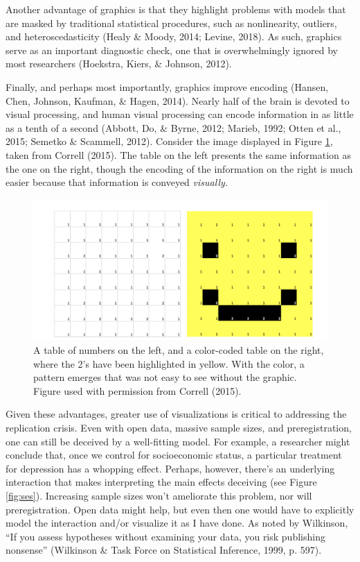 \documentclass[
  man]{apa6}
\begin{document}
Another advantage of graphics is that they highlight problems with models that are masked by traditional statistical procedures, such as nonlinearity, outliers, and heteroscedasticity (Healy \& Moody, 2014; Levine, 2018). As such, graphics serve as an important diagnostic check, one that is overwhelmingly ignored by most researchers (Hoekstra, Kiers, \& Johnson, 2012).

Finally, and perhaps most importantly, graphics improve encoding (Hansen, Chen, Johnson, Kaufman, \& Hagen, 2014). Nearly half of the brain is devoted to visual processing, and human visual processing can encode information in as little as a tenth of a second (Abbott, Do, \& Byrne, 2012; Marieb, 1992; Otten et al., 2015; Semetko \& Scammell, 2012). Consider the image displayed in Figure \ref{fig:smiley}, taken from Correll (2015). The table on the left presents the same information as the one on the right, though the encoding of the information on the right is much easier because that information is conveyed \emph{visually.}

\begin{figure}
\centering
\includegraphics{images/smiley.png}
\caption{A table of numbers on the left, and a color-coded table on the right, where the 2's have been highlighted in yellow. With the color, a pattern emerges that was not easy to see without the graphic. Figure used with permission from Correll (2015).}
\label{fig:smiley}
\end{figure}

Given these advantages, greater use of visualizations is critical to addressing the replication crisis. Even with open data, massive sample sizes, and preregistration, one can still be deceived by a well-fitting model. For example, a researcher might conclude that, once we control for socioeconomic status, a particular treatment for depression has a whopping effect. Perhaps, however, there's an underlying interaction that makes interpreting the main effects deceiving (see Figure \ref{fig:ses}). Increasing sample sizes won't ameliorate this problem, nor will preregistration. Open data might help, but even then one would have to explicitly model the interaction and/or visualize it as I have done. As noted by Wilkinson, \enquote{If you assess hypotheses without examining your data, you risk publishing nonsense} (Wilkinson \& Task Force on Statistical Inference, 1999, p. 597).
\end{document}
